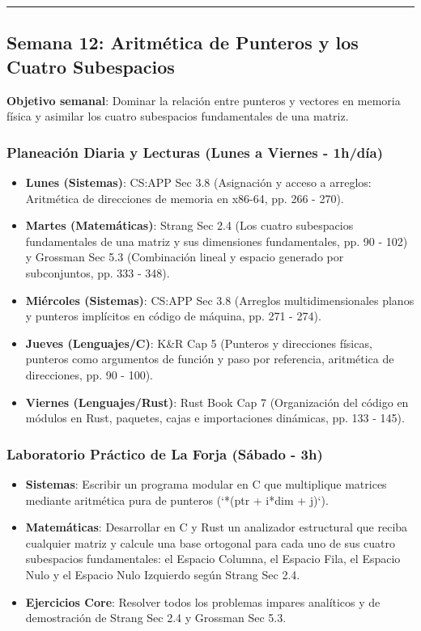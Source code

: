 \documentclass[11pt, a4paper]{article}
\begin{document}
\noindent\rule{\textwidth}{0.4pt}

\subsection{Semana 12: Aritmética de Punteros y los Cuatro Subespacios}
\textbf{Objetivo semanal}: Dominar la relación entre punteros y vectores en memoria física y asimilar los cuatro subespacios fundamentales de una matriz.

\subsubsection{Planeación Diaria y Lecturas (Lunes a Viernes - 1h/día)}
\begin{itemize}
    \item \textbf{Lunes (Sistemas)}: CS:APP Sec 3.8 (Asignación y acceso a arreglos: Aritmética de direcciones de memoria en x86-64, pp. 266 - 270).
    \item \textbf{Martes (Matemáticas)}: Strang Sec 2.4 (Los cuatro subespacios fundamentales de una matriz y sus dimensiones fundamentales, pp. 90 - 102) y Grossman Sec 5.3 (Combinación lineal y espacio generado por subconjuntos, pp. 333 - 348).
    \item \textbf{Miércoles (Sistemas)}: CS:APP Sec 3.8 (Arreglos multidimensionales planos y punteros implícitos en código de máquina, pp. 271 - 274).
    \item \textbf{Jueves (Lenguajes/C)}: K\&R Cap 5 (Punteros y direcciones físicas, punteros como argumentos de función y paso por referencia, aritmética de direcciones, pp. 90 - 100).
    \item \textbf{Viernes (Lenguajes/Rust)}: Rust Book Cap 7 (Organización del código en módulos en Rust, paquetes, cajas e importaciones dinámicas, pp. 133 - 145).
\end{itemize}

\subsubsection{Laboratorio Práctico de La Forja (Sábado - 3h)}
\begin{itemize}
    \item \textbf{Sistemas}: Escribir un programa modular en C que multiplique matrices mediante aritmética pura de punteros (`*(ptr + i*dim + j)`).
    \item \textbf{Matemáticas}: Desarrollar en C y Rust un analizador estructural que reciba cualquier matriz y calcule una base ortogonal para cada uno de sus cuatro subespacios fundamentales: el Espacio Columna, el Espacio Fila, el Espacio Nulo y el Espacio Nulo Izquierdo según Strang Sec 2.4.
    \item \textbf{Ejercicios Core}: Resolver todos los problemas impares analíticos y de demostración de Strang Sec 2.4 y Grossman Sec 5.3.
\end{itemize}
\end{document}
